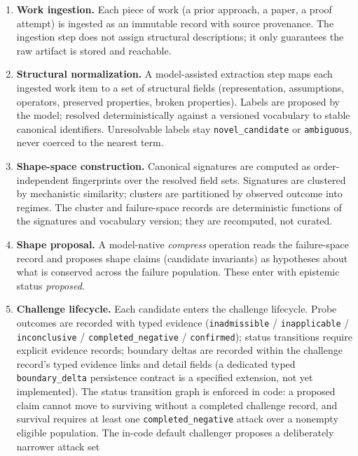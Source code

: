 \documentclass[11pt]{article}
\theoremstyle{gowthm}
\theoremstyle{gowplain}
\begin{document}
\begin{enumerate}[label=\arabic*.]
  \item \textbf{Work ingestion.} Each piece of work (a prior approach, a
    paper, a proof attempt) is ingested as an immutable record with source
    provenance. The ingestion step does not assign structural descriptions;
    it only guarantees the raw artifact is stored and reachable.
  \item \textbf{Structural normalization.} A model-assisted extraction step
    maps each ingested work item to a set of structural fields
    (representation, assumptions, operators, preserved properties, broken
    properties). Labels are proposed by the model; resolved deterministically
    against a versioned vocabulary to stable canonical identifiers. Unresolvable
    labels stay \texttt{novel\_candidate} or \texttt{ambiguous}, never coerced
    to the nearest term.
  \item \textbf{Shape-space construction.} Canonical signatures are computed
    as order-independent fingerprints over the resolved field sets. Signatures
    are clustered by mechanistic similarity; clusters are partitioned by
    observed outcome into regimes. The cluster and failure-space records are
    deterministic functions of the signatures and vocabulary version; they
    are recomputed, not curated.
  \item \textbf{Shape proposal.} A model-native \emph{compress} operation
    reads the failure-space record and proposes shape claims (candidate
    invariants) as hypotheses about what is conserved across the failure
    population. These enter with epistemic status \emph{proposed}.
  \item \textbf{Challenge lifecycle.} Each candidate enters the challenge
    lifecycle. Probe outcomes are recorded with typed evidence
    (\texttt{inadmissible} / \texttt{inapplicable} / \texttt{inconclusive} /
    \texttt{completed\_negative} / \texttt{confirmed}); status transitions
    require explicit evidence records; boundary deltas are recorded within the
    challenge record's typed evidence links and detail fields (a dedicated
    typed \texttt{boundary\_delta} persistence contract is a specified
    extension, not yet implemented). The status transition
    graph is enforced in code: a proposed claim cannot move to surviving
    without a completed challenge record, and survival requires at least one
    \texttt{completed\_negative} attack over a nonempty eligible population.
    The in-code default challenger proposes a deliberately narrower attack set

\end{enumerate}
\end{document}
